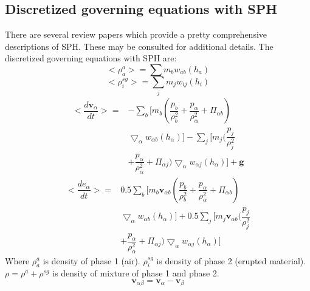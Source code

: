 \documentclass[conference,compsoc]{IEEEtran}
\begin{document}
\subsection{Discretized governing equations with SPH}
There are several review papers \cite{monaghan1992smoothed, monaghan2005smoothed, price2012smoothed, monaghan2012smoothed} which provide a pretty comprehensive descriptions of SPH. These may be consulted for additional details. %
The discretized governing equations with SPH are:
\begin{equation}
<\rho_a^a>=\sum m_b w_{ab} (h_a) \label{eq:gov-sph-d1}
\end{equation}
\begin{equation}
<\rho_i^{sg}>=\sum_j m_j w_{ij} (h_i) \label{eq:gov-sph-d2}
\end{equation}
\begin{equation}
\begin{split}
<\dfrac{d \textbf{v}_{\alpha}}{d t}>= &
-\sum_b [m_b (\dfrac{p_b}{\rho_b^2} + \dfrac{p_{\alpha}}{\rho_{\alpha}^2} + \Pi_{\alpha b}) \\ &\bigtriangledown_{\alpha}w_{\alpha b}(h_{\alpha})]
-\sum_j [m_j (\dfrac{p_j}{\rho_j^2} \\ & + \dfrac{p_{\alpha}}{\rho_{\alpha}^2} + \Pi_{\alpha j}) \bigtriangledown_{\alpha}w_{\alpha j}(h_{\alpha})]
+\textbf{g}
\end{split} 
\label{eq:gov-sph-v}
\end{equation}
\begin{equation}
\begin{split}
<\dfrac{d e_{\alpha}}{d t}>=&
 0.5\sum_b [m_b \textbf{v}_{\alpha b}(\dfrac{p_b}{\rho_b^2} + \dfrac{p_{\alpha}}{\rho_{\alpha}^2} + \Pi_{\alpha b})\\ & \bigtriangledown_{\alpha}w_{\alpha b}(h_{\alpha})]
+0.5\sum_j [m_j \textbf{v}_{\alpha b}(\dfrac{p_j}{\rho_j^2} \\ & + \dfrac{p_{\alpha}}{\rho_{\alpha}^2} + \Pi_{\alpha j}) \bigtriangledown_{\alpha}w_{\alpha j}(h_{\alpha})]
\end{split} 
\label{eq:gov-sph-e}
\end{equation}
Where
$\rho_a^a$ is density of phase 1 (air).
$\rho_i^{sg}$ is density of phase 2 (erupted material).
$\rho=\rho^a + \rho^{sg}$ is density of mixture of phase 1 and phase 2.
\begin{equation}
\textbf{v}_{\alpha \beta}=\textbf{v}_{\alpha}-\textbf{v}_{\beta}
\end{equation}
\end{document}
